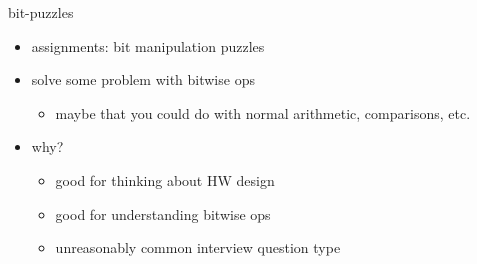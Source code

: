 \begin{frame}{bit-puzzles}
\begin{itemize}
    \item assignments: bit manipulation puzzles
    \vspace{.5cm}
    \item solve some problem with bitwise ops
        \begin{itemize}
        \item maybe that you could do with normal arithmetic, comparisons, etc.
        \end{itemize}
    \item why?
        \begin{itemize}
        \item good for thinking about HW design
        \item good for understanding bitwise ops
        \item unreasonably common interview question type
        \end{itemize}
    \end{itemize}
\end{frame}
